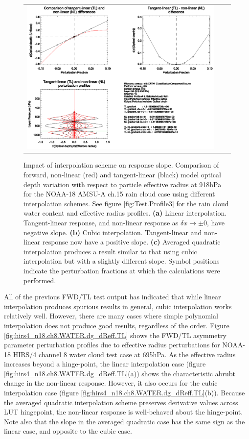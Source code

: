 \begin{figure}[htp]
\begin{tabular}{c c c}
    \includegraphics[bb=90 400 300 540,clip,scale=0.7]{graphics/Cloud/TL/amsua_n18.ch15.RAIN.AVGQUAD.dOd_dReff.eps} 
  \end{tabular}
  \caption{Impact of interpolation scheme on response slope. Comparison of forward, non-linear (red) and tangent-linear (black) model optical depth variation with respect to particle effective radius at 918hPa for the NOAA-18 AMSU-A ch.15 rain cloud case using different interpolation schemes. See figure \ref{fig:Test.Profile3} for the rain cloud water content and effective radius profiles. \textbf{(a)} Linear interpolation. Tangent-linear response, and non-linear response as $\delta x \rightarrow\pm 0$, have negative slope. \textbf{(b)} Cubic interpolation. Tangent-linear and non-linear response now have a positive slope. \textbf{(c)} Averaged quadratic interpolation produces a result similar to that using cubic interpolation but with a slightly different slope.
Symbol positions indicate the perturbation fractions at which the calculations were performed.}
  \label{fig:amsua_n18.ch15.RAIN.dOd_dReff}
\end{figure}

All of the previous FWD/TL test output has indicated that while linear interpolation produces spurious results in general, cubic interpolation works relatively well. However, there are many cases where simple polynomial interpolation does not produce good results, regardless of the order. Figure \ref{fig:hirs4_n18.ch8.WATER.dg_dReff.TL} shows the FWD/TL asymmetry parameter perturbation profiles due to effective radius perturbations for NOAA-18 HIRS/4 channel 8 water cloud test case at 695hPa. As the effective radius increases beyond a hinge-point, the linear interpolation case (figure \ref{fig:hirs4_n18.ch8.WATER.dg_dReff.TL}(a)) shows the characteristic abrubt change in the non-linear response. However, it also occurs for the cubic interpolation case (figure \ref{fig:hirs4_n18.ch8.WATER.dg_dReff.TL}(b)). Because the averaged quadratic interpolation scheme preserves derivative values across LUT hingepoint, the non-linear response is well-behaved about the hinge-point. Note also that the slope in the averaged quadratic case has the same sign as the linear case, and opposite to the cubic case. 

